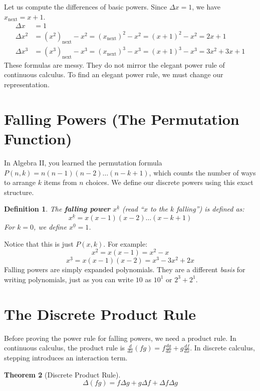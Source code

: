 \documentclass[12pt]{article}
\newtheorem{theorem}{Theorem}
\newtheorem{definition}[theorem]{Definition}
\newcommand{\next}[1]{#1_{\text{next}}}
\newcommand{\falling}[2]{{#1}^{\underline{#2}}}
\begin{document}
Let us compute the differences of basic powers. Since $\Delta x = 1$, we have $\next{x} = x + 1$.
\begin{align*}
    \Delta x &= 1 \\
    \Delta x^2 &= \next{(x^2)} - x^2 = (\next{x})^2 - x^2 = (x+1)^2 - x^2 = 2x + 1 \\
    \Delta x^3 &= \next{(x^3)} - x^3 = (\next{x})^3 - x^3 = (x+1)^3 - x^3 = 3x^2 + 3x + 1
\end{align*}
These formulas are messy. They do not mirror the elegant power rule of continuous calculus. To find an elegant power rule, we must change our representation.

\section{Falling Powers (The Permutation Function)}

In Algebra II, you learned the permutation formula $P(n, k) = n(n-1)(n-2)\dots(n-k+1)$, which counts the number of ways to arrange $k$ items from $n$ choices. We define our discrete powers using this exact structure.

\begin{definition}
The \textbf{falling power} $\falling{x}{k}$ (read ``$x$ to the $k$ falling'') is defined as:
\[ \falling{x}{k} = x(x-1)(x-2)\dots(x-k+1) \]
For $k=0$, we define $\falling{x}{0} = 1$.
\end{definition}

Notice that this is just $P(x, k)$. For example:
\[ \falling{x}{2} = x(x-1) = x^2 - x \]
\[ \falling{x}{3} = x(x-1)(x-2) = x^3 - 3x^2 + 2x \]
Falling powers are simply expanded polynomials. They are a different \textit{basis} for writing polynomials, just as you can write $10$ as $10^1$ or $2^3 + 2^1$.

\section{The Discrete Product Rule}

Before proving the power rule for falling powers, we need a product rule. In continuous calculus, the product rule is $\frac{d}{dx}(fg) = f\frac{dg}{dx} + g\frac{df}{dx}$. In discrete calculus, stepping introduces an interaction term.

\begin{theorem}[Discrete Product Rule]
\[ \Delta(fg) = f\Delta g + g\Delta f + \Delta f \Delta g \]
\end{theorem}
\end{document}
